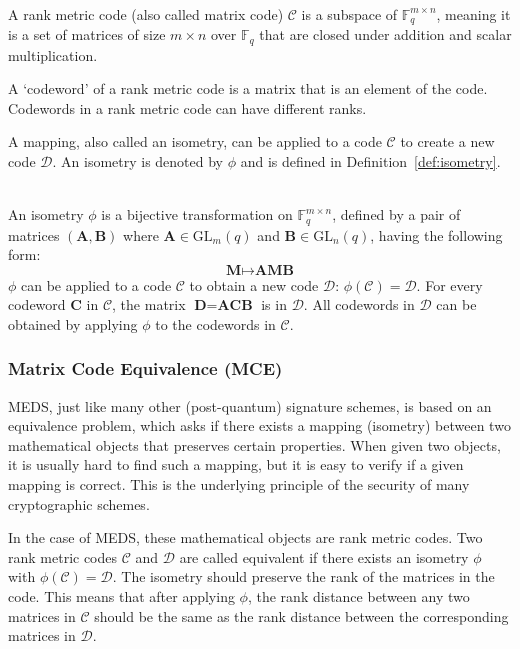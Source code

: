 \documentclass[11pt,a4paper]{report}
\theoremstyle{definition}
\begin{document}
\begin{definition}~\\
  \label{def:rankmetriccode}
  A rank metric code (also called matrix code) $\mathcal{C}$ is a subspace of $\mathbb{F}_q^{m \times n}$, meaning it is a set of matrices of size $m \times n$ over $\mathbb{F}_q$ that are closed under addition and scalar multiplication.
\end{definition}

A `codeword' of a rank metric code is a matrix that is an element of the code. Codewords in a rank metric code can have different ranks.

A mapping, also called an isometry, can be applied to a code $\mathcal{C}$ to create a new code $\mathcal{D}$. An isometry is denoted by $\phi$ and is defined in Definition~\ref{def:isometry}.

\begin{definition}~\\
  \label{def:isometry}
  An isometry $\phi$ is a bijective transformation on $\mathbb{F}_q^{m \times n}$, defined by a pair of matrices $(\textbf{A}, \textbf{B})$ where $\textbf{A} \in \text{GL}_m(q)$ and $\textbf{B} \in \text{GL}_n(q)$, having the following form:
  \[
    \textbf{M} \mapsto \textbf{A} \textbf{M} \textbf{B}
  \]
  $\phi$ can be applied to a code $\mathcal{C}$ to obtain a new code $\mathcal{D}$: $\phi(\mathcal{C}) = \mathcal{D}$. For every codeword $\textbf{C}$ in $\mathcal{C}$, the matrix $\textbf{D} = \textbf{A} \textbf{C} \textbf{B}$ is in $\mathcal{D}$. All codewords in $\mathcal{D}$ can be obtained by applying $\phi$ to the codewords in $\mathcal{C}$.
\end{definition}

\subsubsection{Matrix Code Equivalence (MCE)}
MEDS, just like many other (post-quantum) signature schemes, is based on an equivalence problem, which asks if there exists a mapping (isometry) between two mathematical objects that preserves certain properties. When given two objects, it is usually hard to find such a mapping, but it is easy to verify if a given mapping is correct. This is the underlying principle of the security of many cryptographic schemes.

In the case of MEDS, these mathematical objects are rank metric codes. Two rank metric codes $\mathcal{C}$ and $\mathcal{D}$ are called equivalent if there exists an isometry $\phi$ with $\phi(\mathcal{C}) = \mathcal{D}$. The isometry should preserve the rank of the matrices in the code. This means that after applying $\phi$, the rank distance between any two matrices in $\mathcal{C}$ should be the same as the rank distance between the corresponding matrices in $\mathcal{D}$.
\end{document}
